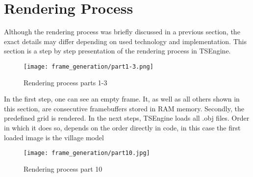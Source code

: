 \newpage
\section{Rendering Process}
Although the rendering process was briefly discussed in a previous section, the exact details may differ depending on used technology and implementation. This section is a step by step presentation of the rendering process in TSEngine.\\
\begin{figure}[H]
  \texttt{[image: frame\_generation/part1-3.png]}
  \caption{Rendering process parts 1-3}
\end{figure}
In the first step, one can see an empty frame. It, as well as all others shown in this section, are consecutive framebuffers stored in RAM memory.
Secondly, the predefined grid is rendered.
In the next steps, TSEngine loads all .obj files. Order in which it does so, depends on the order directly in code, in this case the first loaded image is the village model \cite{VillageModel}



\begin{wrapfigure}{r}{0.6\textwidth}
  \texttt{[image: frame\_generation/part10.jpg]}
  \caption{Rendering process part 10}
\end{wrapfigure}